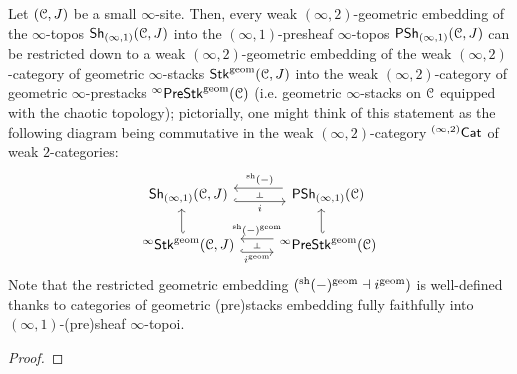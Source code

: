                 \begin{theorem} \label{theorem: (infinity,1)_sheafification_of_derived_geometric_prestacks}
                    Let $(\mathcal{C}, J)$ be a small $\infty$-site. Then, every weak $(\infty, 2)$-geometric embedding of the $\infty$-topos $\mathsf{Sh}_{(\infty, 1)}(\mathcal{C}, J)$ into the $(\infty, 1)$-presheaf $\infty$-topos $\mathsf{PSh}_{(\infty, 1)}(\mathcal{C}, J)$ can be restricted down to a weak $(\infty, 2)$-geometric embedding of the weak $(\infty, 2)$-category of geometric $\infty$-stacks $\mathsf{Stk}^{\mathrm{geom}}(\mathcal{C}, J)$ into the weak $(\infty, 2)$-category of geometric $\infty$-prestacks ${}^{\infty}\mathsf{Pre}\mathsf{Stk}^{\mathrm{geom}}(\mathcal{C})$ (i.e. geometric $\infty$-stacks on $\mathcal{C}$ equipped with the chaotic topology); pictorially, one might think of this statement as the following diagram being commutative in the weak $(\infty, 2)$-category ${}^{(\infty, 2)}\mathsf{Cat}$ of weak $2$-categories: 
                        $$
                            \begin{tikzcd}
                            	{\Sh_{(\infty, 1)}(\C, J)} & {\Psh_{(\infty, 1)}(\C)} \\
                            	{{}^{\infty}\Stk^{\geom}(\C, J)} & {{}^{\infty}\Pre\Stk^{\geom}(\C)}
                            	\arrow[""{name=0, anchor=center, inner sep=0}, "{{}^{\sh}(-)}"', shift right=2, shorten <=2pt, from=1-2, to=1-1]
                            	\arrow[""{name=1, anchor=center, inner sep=0}, "i"', shift right=2, hook, from=1-1, to=1-2]
                            	\arrow[shift left=2, hook', from=2-1, to=1-1]
                            	\arrow[shift left=2, hook', from=2-2, to=1-2]
                            	\arrow[""{name=2, anchor=center, inner sep=0}, "{i^{\geom}}"', shift right=2, hook, from=2-1, to=2-2]
                            	\arrow[""{name=3, anchor=center, inner sep=0}, "{{}^{\sh}(-)^{\geom}}"', shift right=2, from=2-2, to=2-1]
                            	\arrow["\dashv"{anchor=center, rotate=-90}, draw=none, from=0, to=1]
                            	\arrow["\dashv"{anchor=center, rotate=-90}, draw=none, from=3, to=2]
                            \end{tikzcd}
                        $$
                    Note that the restricted geometric embedding $({}^{\mathrm{sh}}(-)^{\mathrm{geom}} \dashv i^{\mathrm{geom}})$ is well-defined thanks to categories of geometric (pre)stacks embedding fully faithfully into $(\infty, 1)$-(pre)sheaf $\infty$-topoi.
                \end{theorem}
                    \begin{proof}
                        
                    \end{proof}
